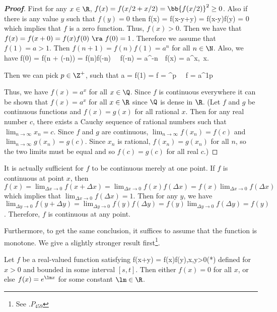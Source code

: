 \begin{proof}[\bf Proof]
First for any $x\in \R$, $f(x) = f(x/2 + x/2) = \bb{f(x/2)}^2 \geq 0$. Also if there is any value $y$ such that $f(y) = 0$ then
\be
f(x) = f(x-y+y) = f(x-y)f(y) = 0
\ee
which implies that $f$ is a zero function. Thus, $f(x)>0$. Then we have that $f(x) = f(x+0) = f(x)f(0) \ \ra\ f(0) = 1$. Therefore we assume that $f(1) = a>1$. Then $f(n+1) = f(n)f(1) = a^n$ for all $n\in\N$. Also, we have
\be
f(0) = f(n + (-n)) = f(n)f(-n) \ \ra\ f(-n) = a^{-n}\ \ra\ f(x) = a^x,\ x\in \Z.
\ee

Then we can pick $p\in \Z^+$, such that
\be
a = f(1) = f = ^p \ \ra\ f = a^{\frac 1p}
\ee

Thus, we have $f(x) = a^x$ for all $x\in \Q$. Since $f$ is continuous everywhere it can be shown that $f(x) =a^x$ for all $x\in\R$ since $\Q$ is dense in $\R$. (Let $f$ and $g$ be continuous functions and $f(x) =g(x)$ for all rational $x$. Then for any real number $c$, there exists a Cauchy sequence of rational numbers such that $\lim_{n\to\infty}x_n =c$. Since $f$ and $g$ are continuous, $\lim_{n\to \infty}f(x_n) = f(c)$ and $\lim_{n\to \infty}g(x_n) = g(c)$. Since $x_n$ is rational, $f(x_n) = g(x_n)$ for all $n$, so the two limits must be equal and so $f(c) = g(c)$ for all real $c$.)%
\end{proof}

\begin{remark}
It is actually sufficient for $f$ to be continuous merely at one point. If $f$ is continuous at point $x$, then $f(x) = \lim_{\Delta x \to 0}f(x+\Delta x) = \lim_{\Delta x \to 0}f(x)f(\Delta x) = f(x)\lim_{\Delta x \to 0}f(\Delta x) $ which implies that $\lim_{\Delta x \to 0}f(\Delta x) = 1$. Then for any $y$, we have $\lim_{\Delta y \to 0} f(y+\Delta y) = \lim_{\Delta y \to 0} f(y)f(\Delta y) = f(y) \lim_{\Delta y \to 0} f(\Delta y) = f(y)$. Therefore, $f$ is continuous at any point.
\end{remark}

Furthermore, to get the same conclusion, it suffices to assume that the function is monotone. We give a slightly stronger result first\footnote{See \cite{Feller_1968_v2}.$P_{459}$}.

\begin{theorem}\label{thm:function_product_is_function_of_sum_bounded_version}
Let $f$ be a real-valued function satisfying
\be
f(x+y) = f(x)f(y),\qquad x,y>0\qquad (*)
\ee
defined for $x>0$ and bounded in some interval $[s,t]$. Then either $f(x)=0$ for all $x$, or else $f(x) = e^{\lm x}$ for some constant $\lm\in\R$.
\end{theorem}

